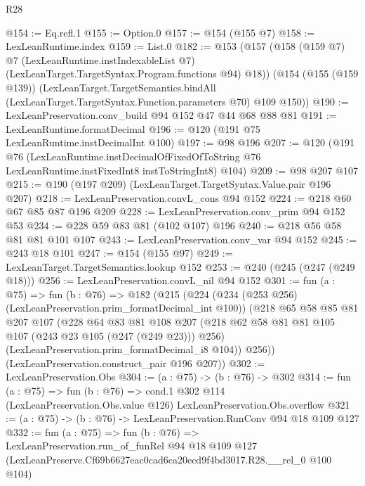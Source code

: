 \begin{lexlean}{R28}
\begin{coremodule}
@154 := Eq.refl.{1}
@155 := Option.{0}
@157 := @154 (@155 @7)
@158 := LexLeanRuntime.index
@159 := List.{0}
@182 := @153
    (@157
      (@158
        (@159 @7)
        @7
        (LexLeanRuntime.instIndexableList @7)
        (LexLeanTarget.TargetSyntax.Program.functions @94)
        @18))
    (@154
      (@155 (@159 @139))
      (LexLeanTarget.TargetSemantics.bindAll
        (LexLeanTarget.TargetSyntax.Function.parameters @70)
        @109
        @150))
@190 := LexLeanPreservation.conv_build @94 @152 @47 @44 @68 @88 @81
@191 := LexLeanRuntime.formatDecimal
@196 := @120 (@191 @75 LexLeanRuntime.instDecimalInt @100)
@197 := @98 @196
@207 := @120
    (@191
      @76
      (LexLeanRuntime.instDecimalOfFixedOfToString
        @76
        LexLeanRuntime.instFixedInt8
        instToStringInt8)
      @104)
@209 := @98 @207 @107
@215 := @190 (@197 @209) (LexLeanTarget.TargetSyntax.Value.pair @196 @207)
@218 := LexLeanPreservation.convL_cons @94 @152
@224 := @218 @60 @67 @85 @87 @196 @209
@228 := LexLeanPreservation.conv_prim @94 @152 @53
@234 := @228 @59 @83 @81 (@102 @107) @196
@240 := @218 @56 @58 @81 @81 @101 @107
@243 := LexLeanPreservation.conv_var @94 @152
@245 := @243 @18 @101
@247 := @154 (@155 @97)
@249 := LexLeanTarget.TargetSemantics.lookup @152
@253 := @240 (@245 (@247 (@249 @18)))
@256 := LexLeanPreservation.convL_nil @94 @152
@301 := fun (a : @75) =>
  fun (b : @76) =>
  @182
    (@215
      (@224
        (@234 (@253 @256) (LexLeanPreservation.prim_formatDecimal_int @100))
        (@218
          @65
          @58
          @85
          @81
          @207
          @107
          (@228
            @64
            @83
            @81
            @108
            @207
            (@218 @62 @58 @81 @81 @105 @107 (@243 @23 @105 (@247 (@249 @23))) @256)
            (LexLeanPreservation.prim_formatDecimal_i8 @104))
          @256))
      (LexLeanPreservation.construct_pair @196 @207))
@302 := LexLeanPreservation.Obs
@304 := (a : @75) -> (b : @76) -> @302
@314 := fun (a : @75) =>
  fun (b : @76) =>
  cond.{1} @302 @114 (LexLeanPreservation.Obs.value @126) LexLeanPreservation.Obs.overflow
@321 := (a : @75) -> (b : @76) -> LexLeanPreservation.RunConv @94 @18 @109 @127
@332 := fun (a : @75) =>
  fun (b : @76) =>
  LexLeanPreservation.run_of_funRel
    @94
    @18
    @109
    @127
    (LexLeanPreserve.Cf69b6627eac0cad6ca20ecd9f4bd3017.R28.__rel_0 @100 @104)
\end{coremodule}
\end{lexlean}
